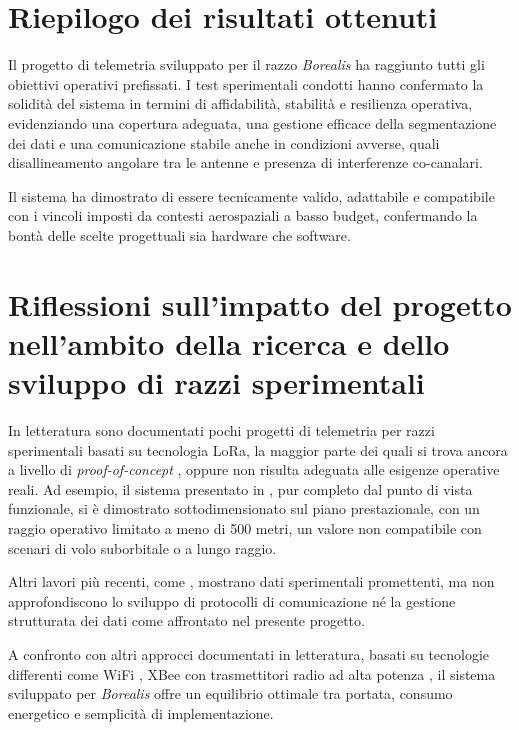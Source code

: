 \documentclass[12pt,a4paper,twoside]{book}
\begin{document}
\section{Riepilogo dei risultati ottenuti}

Il progetto di telemetria sviluppato per il razzo \emph{Borealis} ha raggiunto
tutti gli obiettivi operativi prefissati.
I test sperimentali condotti hanno confermato la solidità del sistema in termini
di affidabilità, stabilità e resilienza operativa, evidenziando una copertura
adeguata, una gestione efficace della segmentazione dei dati e una comunicazione
stabile anche in condizioni avverse, quali disallineamento angolare tra le antenne
e presenza di interferenze co-canalari.

Il sistema ha dimostrato di essere tecnicamente valido, adattabile e compatibile
con i vincoli imposti da contesti aerospaziali a basso budget, confermando la bontà
delle scelte progettuali sia hardware che software.

\section{Riflessioni sull'impatto del progetto nell'ambito della ricerca e dello sviluppo di razzi sperimentali}
In letteratura sono documentati pochi progetti di telemetria per razzi sperimentali
basati su tecnologia \ac{LoRa}, la maggior parte dei quali si trova ancora a
livello di \emph{proof-of-concept} \cite{Andrade2022}, oppure non risulta adeguata
alle esigenze operative reali.
Ad esempio, il sistema presentato in \cite{Misbahuddin2022}, pur completo dal punto
di vista funzionale, si è dimostrato sottodimensionato sul piano prestazionale,
con un raggio operativo limitato a meno di 500 metri, un valore non compatibile con
scenari di volo suborbitale o a lungo raggio.

Altri lavori più recenti, come \cite{Brzynska2023,inproceedings}, mostrano dati sperimentali
promettenti, ma non approfondiscono lo sviluppo di protocolli di comunicazione
né la gestione strutturata dei dati come affrontato nel presente progetto.

A confronto con altri approcci documentati in letteratura, basati su tecnologie
differenti come WiFi \cite{muchiri2024implementation}, XBee \cite{10150/626955} con trasmettitori radio
ad alta potenza \cite{lombardozzo2017development,10150/666950}, il sistema
sviluppato per \emph{Borealis} offre un equilibrio ottimale tra portata, consumo
energetico e semplicità di implementazione.
\end{document}
